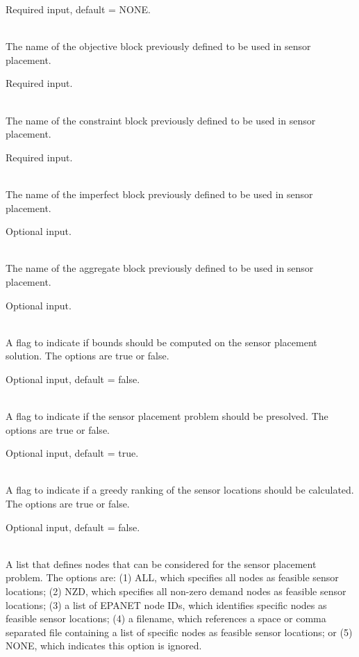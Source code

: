 \begin{description}[topsep=0pt,parsep=0.5em,itemsep=-0.4em]
\begin{description}[topsep=0pt,parsep=0.5em,itemsep=-0.4em]
                Required input, default = NONE.
    \item[{objective}]\hfill
\\The name of the objective block previously defined to be used in sensor placement.
                
                Required input.
    \item[{constraint}]\hfill
\\The name of the constraint block previously defined to be used in sensor placement.
                
                Required input.
    \item[{imperfect}]\hfill
\\The name of the imperfect block previously defined to be used in sensor placement.
                
                Optional input.
    \item[{aggregate}]\hfill
\\The name of the aggregate block previously defined to be used in sensor placement.
                
                Optional input.
    \item[{compute bound}]\hfill
\\A flag to indicate if bounds should be computed on the sensor placement
                solution. The options are true or false. 
                
                Optional input, default = false.
    \item[{presolve}]\hfill
\\A flag to indicate if the sensor placement problem should be presolved. 
                The options are true or false. 
                
                Optional input, default = true.
    \item[{compute greedy ranking}]\hfill
\\A flag to indicate if a greedy ranking of the sensor locations should be calculated. 
                The options are true or false. 
                
                Optional input, default = false.
    \item[{location}]\hfill
    \begin{description}[topsep=0pt,parsep=0.5em,itemsep=-0.4em]
      \item[{feasible nodes}]\hfill
\\A list that defines nodes that can be considered for the sensor placement problem.
                The options are:
                (1) ALL, which specifies all nodes as feasible sensor locations;
                (2) NZD, which specifies all non-zero demand nodes as feasible sensor locations;
                (3) a list of EPANET node IDs, which identifies specific nodes as feasible sensor locations; 
                (4) a filename, which references a space or comma separated file containing a list of 
                specific nodes as feasible sensor locations; or
                (5) NONE, which indicates this option is ignored.
                

\end{description}
\end{description}
\end{description}
